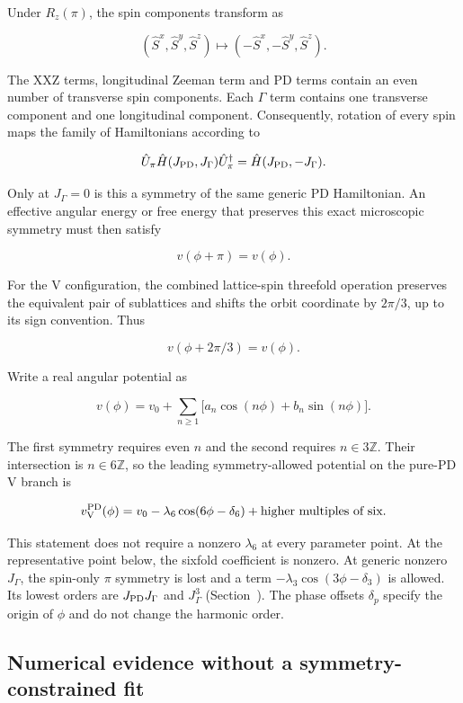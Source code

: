 Under \(R_z(\pi)\), the spin components transform as

\[
(\hat S^x,\hat S^y,\hat S^z)\longmapsto(-\hat S^x,-\hat S^y,\hat S^z).
\]

The XXZ terms, longitudinal Zeeman term and PD terms contain an even
number of transverse spin components. Each \(\Gamma\) term contains one
transverse component and one longitudinal component. Consequently,
rotation of every spin maps the family of Hamiltonians according to

\[
\hat U_\pi\hat H(J_{\rm PD},J_\Gamma)\hat U_\pi^\dagger
=\hat H(J_{\rm PD},-J_\Gamma).
\]

Only at \(J_\Gamma=0\) is this a symmetry of the same generic PD
Hamiltonian. An effective angular energy or free energy that preserves
this exact microscopic symmetry must then satisfy

\[
v(\phi+\pi)=v(\phi).
\]

For the V configuration, the combined lattice-spin threefold operation
preserves the equivalent pair of sublattices and shifts the orbit
coordinate by \(2\pi/3\), up to its sign convention. Thus

\[
v(\phi+2\pi/3)=v(\phi).
\]

Write a real angular potential as

\[
v(\phi)=v_0+\sum_{n\ge1}\bigl[a_n\cos(n\phi)+b_n\sin(n\phi)\bigr].
\]

The first symmetry requires even \(n\) and the second requires
\(n\in3\mathbb Z\). Their intersection is \(n\in6\mathbb Z\), so the
leading symmetry-allowed potential on the pure-PD V branch is

\[
v_{\rm V}^{\rm PD}(\phi)
=v_0-\lambda_6\cos(6\phi-\delta_6)+\text{higher multiples of six}.
\]

This statement does not require a nonzero \(\lambda_6\) at every
parameter point. At the representative point below, the sixfold
coefficient is nonzero. At generic nonzero \(J_\Gamma\), the spin-only
\(\pi\) symmetry is lost and a term \(-\lambda_3\cos(3\phi-\delta_3)\)
is allowed. Its lowest orders are \(J_{\rm PD}J_\Gamma\) and
\(J_\Gamma^3\) (Section~). The phase offsets \(\delta_p\) specify the origin of
\(\phi\) and do not change the harmonic order.

\subsection{Numerical evidence without a symmetry-constrained
fit}\label{numerical-evidence-without-a-symmetry-constrained-fit}

